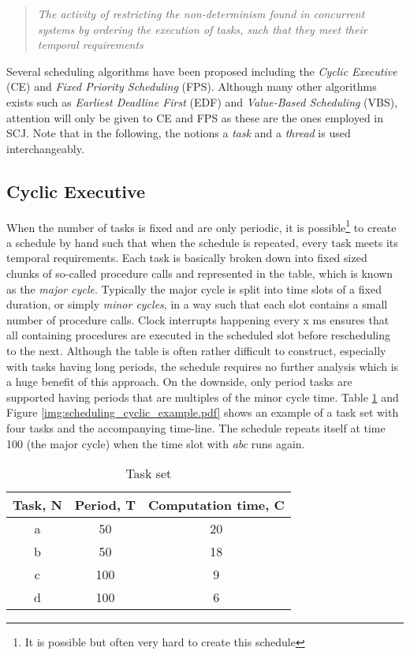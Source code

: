 \begin{quotation}
	\textit{The activity of restricting the non-determinism found in concurrent systems by ordering the execution of tasks, such that they meet their temporal requirements}
\end{quotation}

Several scheduling algorithms have been proposed including the \textit{Cyclic Executive} (CE) and \textit{Fixed Priority Scheduling} (FPS). Although many other algorithms exists such as \textit{Earliest Deadline First} (EDF) and \textit{Value-Based Scheduling} (VBS), attention will only be given to CE and FPS as these are the ones employed in SCJ. Note that in the following, the notions a \textit{task} and a \textit{thread} is used interchangeably.

\subsection{Cyclic Executive}
When the number of tasks is fixed and are only periodic, it is possible\footnote{It is possible but often very hard to create this schedule} to create a schedule by hand such that when the schedule is repeated, every task meets its temporal requirements. Each task is basically broken down into fixed sized chunks of so-called procedure calls and represented in the table, which is known as the \textit{major cycle}. Typically the major cycle is split into time slots of a fixed duration, or simply \textit{minor cycles}, in a way such that each slot contains a small number of procedure calls. Clock interrupts happening every x ms ensures that all containing procedures are executed in the scheduled slot before rescheduling to the next. Although the table is often rather difficult to construct, especially with tasks having long periods, the schedule requires no further analysis which is a huge benefit of this approach. On the downside, only period tasks are supported having periods that are multiples of the minor cycle time. Table \ref{table:CEtaskset} and Figure \ref{img:scheduling_cyclic_example.pdf} shows an example of a task set with four tasks and the accompanying time-line. The schedule repeats itself at time 100 (the major cycle) when the time slot with \textit{abc} runs again. 

\begin{table}[ht]
\caption{Task set}
\centering
\begin{tabular}{c c c}
\hline\hline
Task, N & Period, T & Computation time, C \\ [0.5ex]
\hline 
a & 50  & 20 \\
b & 50  & 18 \\
c & 100 & 9  \\
d & 100 & 6  \\ [1ex]
\hline
\end{tabular}
\label{table:CEtaskset}
\end{table}


